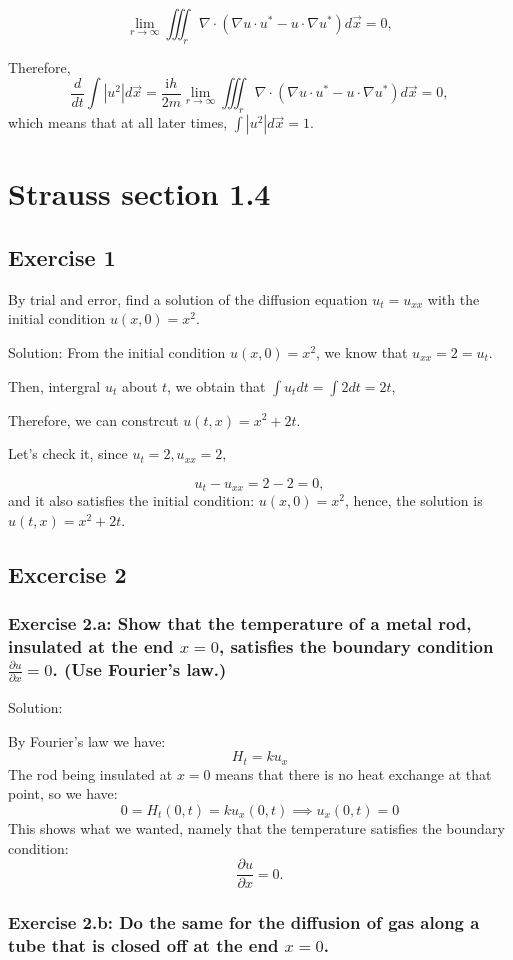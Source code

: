\documentclass{article}
\begin{document}
		\[ \lim_{r \to \infty}\iiint_{r}^{} \nabla \cdot (\nabla u \cdot u^* -u\cdot \nabla u^*)d \vec{x } =0,\]

		Therefore, \[ \frac{d}{dt}\int \left | u^2 \right | d \vec{x }=\frac{\mathrm{i}h}{2m}\lim_{r \to \infty}\iiint_{r}^{} \nabla \cdot (\nabla u \cdot u^* -u\cdot \nabla u^*)d \vec{x }=0,\]
			which means that at all later times, $ \int \left | u^2 \right | d \vec{x } =1$.
		
\section{Strauss section 1.4}
\subsection{Exercise 1}
By trial and error, find a solution of the diffusion equation $u_t=u_{xx}$ with the initial condition $u(x,0)=x^2.$
		
		Solution: From the initial condition $u(x,0)=x^2$, we know that $u_{xx}=2=u_t$. 
		
		Then, intergral $u_{t}$ about $t$, we obtain that $\int u_{t} dt= \int 2 dt = 2t$,

		Therefore, we can constrcut $u(t,x)=x^2+2t$.

		Let's check it, since $u_{t}=2, u_{xx}=2$,

		\[u_{t}-u_{xx}=2-2=0,\] and it also satisfies the initial condition: $u(x,0)=x^2$, hence, the solution is $u(t,x)=x^2+2t$.

		\subsection{Excercise 2}
			\subsubsection{Exercise 2.a: Show that the temperature of a metal rod,
			insulated at the end $x=0$, satisfies the boundary
			condition $\frac{\partial u}{\partial x} =0$. (Use
		Fourier's law.)}

			Solution:

			By Fourier's law we have:
			\[
				H_t = ku_x
			\]
			The rod being insulated at $x=0$ means that there is no
			heat exchange at that point, so we have:
			\[
				0 = H_t(0,t) = ku_x(0,t) \implies u_x(0,t) =0
			\]
			This shows what we wanted, namely that the temperature
			satisfies the boundary condition:
			\[
				\frac{\partial u}{\partial x} =0.
			\]
			\subsubsection{Exercise 2.b: Do the same for the diffusion of gas along a tube that is closed off at the end $x=0$.}
		
\end{document}
